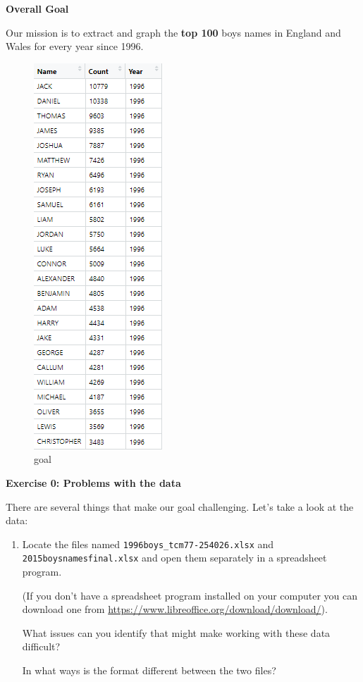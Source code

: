 \documentclass[]{book}
\begin{document}
\textbf{Overall Goal}

Our mission is to extract and graph the \textbf{top 100} boys names in England and Wales for every year since 1996.

\begin{figure}
\centering
\includegraphics{R/RDataWrangling/images/goal.png}
\caption{goal}
\end{figure}

\textbf{Exercise 0: Problems with the data}

There are several things that make our goal challenging. Let's take a look at the data:

\begin{enumerate}
\def\labelenumi{\arabic{enumi}.}
\item
  Locate the files named \texttt{1996boys\_tcm77-254026.xlsx} and
  \texttt{2015boysnamesfinal.xlsx} and open them separately in a
  spreadsheet program.

  (If you don't have a spreadsheet program installed on
  your computer you can download one from
  \url{https://www.libreoffice.org/download/download/}).

  What issues can you identify that might make working
  with these data difficult?

  In what ways is the format different between the two files?
\end{enumerate}
\end{document}
